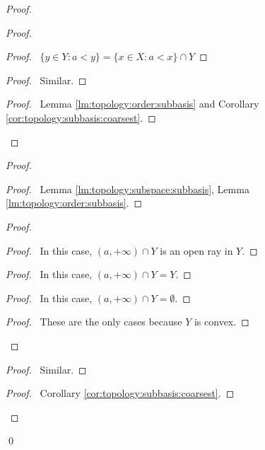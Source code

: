\begin{proof}
  \pf
  \begin{proof}
    \begin{proof}
      \pf\ $\{ y \in Y : a < y \} = \{ x \in X : a < x \} \cap Y$
    \end{proof}
    \begin{proof}
      \pf\ Similar.
    \end{proof}
    \qedstep
    \begin{proof}
      \pf\ Lemma \ref{lm:topology:order:subbasis} and Corollary
      \ref{cor:topology:subbasis:coarsest}.
    \end{proof}
  \end{proof}
  \begin{proof}
    \begin{proof}
      \pf\ Lemma \ref{lm:topology:subspace:subbasis}, Lemma
      \ref{lm:topology:order:subbasis}.
    \end{proof}
    \begin{proof}
      \begin{proof}
        \pf\ In this case, $(a, +\infty) \cap Y$ is an open ray in $Y$.
      \end{proof}
      \begin{proof}
        \pf\ In this case, $(a, +\infty) \cap Y = Y$.
      \end{proof}
      \begin{proof}
        \pf\ In this case, $(a, +\infty) \cap Y = \emptyset$.
      \end{proof}
      \qedstep
      \begin{proof}
        \pf\ These are the only cases because $Y$ is convex.
      \end{proof}
    \end{proof}
    \begin{proof}
      \pf\ Similar.
    \end{proof}
    \qedstep
    \begin{proof}
      \pf\ Corollary \ref{cor:topology:subbasis:coarsest}.
    \end{proof}
  \end{proof}
  \qed
\end{proof}

